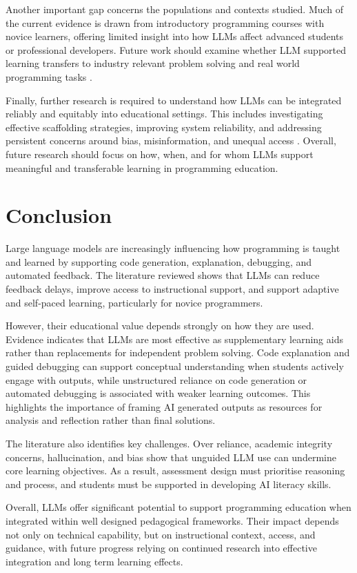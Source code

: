 \documentclass[10pt,journal,compsoc]{IEEEtran}
\begin{document}
Another important gap concerns the populations and contexts studied. Much of the current evidence is drawn from introductory programming courses with novice learners, offering limited insight into how LLMs affect advanced students or professional developers. Future work should examine whether LLM supported learning transfers to industry relevant problem solving and real world programming tasks \cite{Kasneci2023}.

Finally, further research is required to understand how LLMs can be integrated reliably and equitably into educational settings. This includes investigating effective scaffolding strategies, improving system reliability, and addressing persistent concerns around bias, misinformation, and unequal access \cite{katona_ai-based_2025, wang2024largelanguagemodelseducation}. Overall, future research should focus on how, when, and for whom LLMs support meaningful and transferable learning in programming education.

\section{Conclusion}
\label{sec:conclusion}
Large language models are increasingly influencing how programming is taught and learned by supporting code generation, explanation, debugging, and automated feedback. The literature reviewed shows that LLMs can reduce feedback delays, improve access to instructional support, and support adaptive and self-paced learning, particularly for novice programmers.

However, their educational value depends strongly on how they are used. Evidence indicates that LLMs are most effective as supplementary learning aids rather than replacements for independent problem solving. Code explanation and guided debugging can support conceptual understanding when students actively engage with outputs, while unstructured reliance on code generation or automated debugging is associated with weaker learning outcomes. This highlights the importance of framing AI generated outputs as resources for analysis and reflection rather than final solutions.

The literature also identifies key challenges. Over reliance, academic integrity concerns, hallucination, and bias show that unguided LLM use can undermine core learning objectives. As a result, assessment design must prioritise reasoning and process, and students must be supported in developing AI literacy skills.

Overall, LLMs offer significant potential to support programming education when integrated within well designed pedagogical frameworks. Their impact depends not only on technical capability, but on instructional context, access, and guidance, with future progress relying on continued research into effective integration and long term learning effects.

\printbibliography
\end{document}
